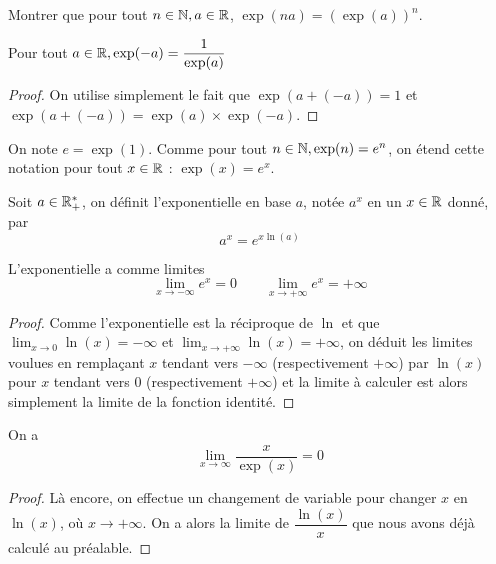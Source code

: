 \begin{exo}
    Montrer que pour tout $n\in\mathbb{N},a\in\mathbb{R}$, $\exp(na)=(\exp(a))^n$.
\end{exo}

\begin{prop}
    Pour tout $a\in\mathbb{R}, \exp(-a) = \dfrac{1}{\exp(a)}$
\end{prop}

\begin{proof}
    On utilise simplement le fait que $\exp(a+(-a)) = 1$ et $\exp(a+(-a)) = \exp(a)\times \exp(-a)$.
\end{proof}

\begin{defi}
    On note $e = \exp(1)$. Comme pour tout $n\in\mathbb{N}, \exp(n) = e^n$, on étend cette notation pour tout $x\in\mathbb{R}$ : $\exp(x) = e^x$.
\end{defi}

\begin{defi}
    Soit $a\in\mathbb{R}_+^*$, on définit l'exponentielle en base $a$, notée $a^x$ en un $x\in\mathbb{R}$ donné, par $$a^x = e^{x\ln(a)}$$
\end{defi}

\begin{prop}
    L'exponentielle a comme limites $$\lim_{x\to -\infty} e^x = 0\qquad \lim_{x\to+\infty}e^x = +\infty$$
\end{prop}

\begin{proof}
    Comme l'exponentielle est la réciproque de $\ln$ et que $\displaystyle\lim_{x\to0}\ln(x)=-\infty$ et $\displaystyle\lim_{x\to+\infty}\ln(x) = +\infty$, on déduit les limites voulues en remplaçant $x$ tendant vers $-\infty$ (respectivement $+\infty$) par $\ln(x)$ pour $x$ tendant vers $0$ (respectivement $+\infty$) et la limite à calculer est alors simplement la limite de la fonction identité.
\end{proof}

\begin{prop}
    On a $$\lim_{x\to\infty}\dfrac{x}{\exp(x)} = 0$$
\end{prop}

\begin{proof}
    Là encore, on effectue un changement de variable pour changer $x$ en $\ln(x)$, où $x\to+\infty$. On a alors la limite de $\dfrac{\ln(x)}{x}$ que nous avons déjà calculé au préalable.
\end{proof}

